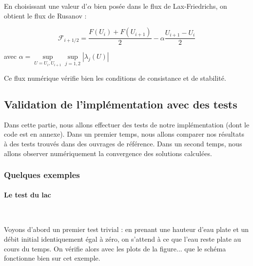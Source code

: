 \documentclass[
11pt, %
francais, %
singlespacing, %
headsepline, %
]{MastersDoctoralThesis} %
\begin{document}
En choisissant une valeur d'$\alpha$ bien posée dans le flux de Lax-Friedrichs, on obtient le flux de Rusanov :

$$ \mathcal{F}_{i+1/2} = \frac{F(U_i) + F(U_{i+1})}{2} - \alpha \frac{U_{i+1} - U_i}{2} $$

avec $ \alpha = \underset{U = U_i , U_{i+1}}{\sup} \underset{j = 1 , 2}{\sup} | \lambda_j(U) | $

Ce flux numérique vérifie bien les conditions de consistance et de stabilité.


\subsection{Validation de l'implémentation avec des tests}

Dans cette partie, nous allons effectuer des tests de notre implémentation (dont le code est en annexe).
Dans un premier temps, nous allons comparer nos résultats à des tests trouvés dans des ouvrages de référence.
Dans un second temps, nous allons observer numériquement la convergence des solutions calculées.

\subsubsection{Quelques exemples}

\paragraph{Le test du lac} \

Voyons d'abord un premier test trivial : en prenant une hauteur d'eau plate et un débit initial identiquement égal à zéro, on s'attend à ce que l'eau reste plate au cours du temps.
On vérifie 	alors avec les plots de la figure... que le schéma fonctionne bien sur cet exemple.
\end{document}

